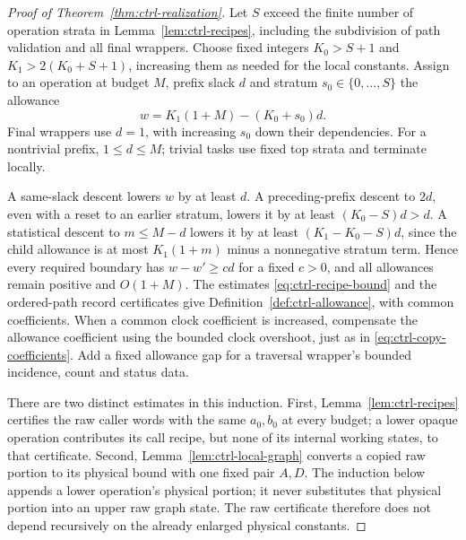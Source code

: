 \begin{proof}[Proof of Theorem~\ref{thm:ctrl-realization}]
Let $S$ exceed the finite number of operation strata in
Lemma~\ref{lem:ctrl-recipes}, including the subdivision of path
validation and all final wrappers.  Choose fixed integers
$K_0>S+1$ and $K_1>2(K_0+S+1)$, increasing them as needed for the
local constants.  Assign to an operation at budget $M$, prefix slack
$d$ and stratum $s_0\in\{0,\ldots,S\}$ the allowance
\begin{equation}\label{eq:ctrl-allowance-formula}
 w=K_1(1+M)-(K_0+s_0)d.
\end{equation}
Final wrappers use $d=1$, with increasing $s_0$ down their dependencies.
For a nontrivial prefix, $1\le d\le M$; trivial tasks use fixed top
strata and terminate locally.

A same-slack descent lowers $w$ by at least $d$.  A preceding-prefix
descent to $2d$, even with a reset to an earlier stratum, lowers it by
at least $(K_0-S)d>d$.  A statistical descent to $m\le M-d$ lowers it
by at least $(K_1-K_0-S)d$, since the child allowance is at most
$K_1(1+m)$ minus a nonnegative stratum term.  Hence every required
boundary has $w-w'\ge c d$ for a fixed $c>0$, and all allowances remain
positive and $O(1+M)$.  The estimates
\eqref{eq:ctrl-recipe-bound} and the ordered-path record certificates
give Definition~\ref{def:ctrl-allowance}, with common coefficients.
When a common clock coefficient is increased, compensate the allowance
coefficient using the bounded clock overshoot, just as in
\eqref{eq:ctrl-copy-coefficients}.  Add a fixed allowance gap for a
traversal wrapper's bounded incidence, count and status data.

There are two distinct estimates in this induction.  First,
Lemma~\ref{lem:ctrl-recipes} certifies the raw caller words with the same
$a_0,b_0$ at every budget; a lower opaque operation contributes its call
recipe, but none of its internal working states, to that certificate.
Second, Lemma~\ref{lem:ctrl-local-graph} converts a copied raw portion to
its physical bound with one fixed pair $A,D$.  The induction below
appends a lower operation's physical portion; it never substitutes that
physical portion into an upper raw graph state.  The raw certificate
therefore does not depend recursively on the already enlarged physical
constants.


\end{proof}
